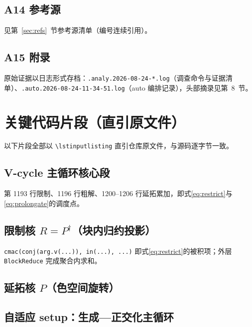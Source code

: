 \documentclass[UTF8]{ctexart}
\begin{document}
\subsection{A14 参考源}

见第~\ref{sec:refs}~节参考源清单（编号连续引用）。

\subsection{A15 附录}

原始证据以日志形式存档：\texttt{\nolinkurl{.analy.2026-08-24-*.log}}（调查命令与证据清单）、\texttt{\nolinkurl{.auto.2026-08-24-11-34-51.log}}（auto 编排记录），头部摘录见第~8~节。

\section{关键代码片段（直引原文件）}

以下片段全部以 \texttt{\textbackslash lstinputlisting} 直引仓库原文件，与源码逐字节一致。

\subsection{V-cycle 主循环核心段}


第 1193 行限制、1196 行粗解、1200--1206 行延拓累加，即式\eqref{eq:restrict}与\eqref{eq:prolongate}的调度点。

\subsection{限制核 $R=P^\dagger$（块内归约投影）}


\texttt{cmac(conj(arg.v(...)), in(...), ...)} 即式\eqref{eq:restrict}的被积项；外层 \texttt{BlockReduce} 完成聚合内求和。

\subsection{延拓核 $P$（色空间旋转）}


\subsection{自适应 setup：生成—正交化主循环}

\end{document}
